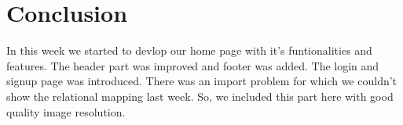 \documentclass[a4paper,12pt]{report}
\begin{document}
\section*{Conclusion}
In this week we started to devlop our home page with it's funtionalities and features. The header part was improved and footer was added. The login and signup page was introduced. There was an import problem for which we couldn't show the relational mapping last week. So, we included this part here with good quality image resolution.
\end{document}
